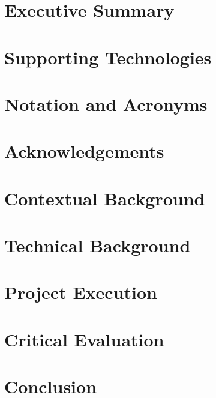 \chapter*{Executive Summary}


\chapter*{Supporting Technologies}


\chapter*{Notation and Acronyms}


\chapter*{Acknowledgements}


\mainmatter

\chapter{Contextual Background}
\label{chap:context}


\chapter{Technical Background}
\label{chap:technical}


\chapter{Project Execution}
\label{chap:execution}


\chapter{Critical Evaluation}
\label{chap:evaluation}


\chapter{Conclusion}
\label{chap:conclusion}


\backmatter



